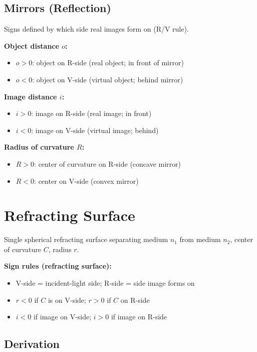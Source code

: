 \documentclass[11pt]{report}
\begin{document}
\subsection*{Mirrors (Reflection)}

Signs defined by which side real images form on (R/V rule).

\textbf{Object distance $o$:}
\begin{itemize}
    \item $o > 0$: object on R-side (real object; in front of mirror)
    \item $o < 0$: object on V-side (virtual object; behind mirror)
\end{itemize}

\textbf{Image distance $i$:}
\begin{itemize}
    \item $i > 0$: image on R-side (real image; in front)
    \item $i < 0$: image on V-side (virtual image; behind)
\end{itemize}

\textbf{Radius of curvature $R$:}
\begin{itemize}
    \item $R > 0$: center of curvature on R-side (concave mirror)
    \item $R < 0$: center on V-side (convex mirror)
\end{itemize}

\section{Refracting Surface}

Single spherical refracting surface separating medium $n_1$ from medium $n_2$, center of curvature $C$, radius $r$.

\textbf{Sign rules (refracting surface):}
\begin{itemize}
    \item V-side = incident-light side; R-side = side image forms on
    \item $r < 0$ if $C$ is on V-side; $r > 0$ if $C$ on R-side
    \item $i < 0$ if image on V-side; $i > 0$ if image on R-side
\end{itemize}

\subsection*{Derivation}
\end{document}
